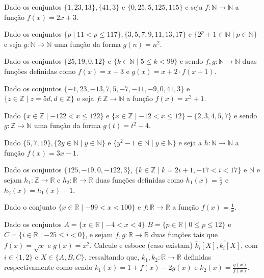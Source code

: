 \begin{exerList}
	\item Dado os conjuntos $\{1,23,13\}, \{41,3\}$ e $\{0, 25, 5, 125, 115\}$ e seja $f: \mathbb{N} \rightarrow \mathbb{N}$ a função $f(x)=2x+3$.
	\item Dado os conjuntos $\{p \mid 11 < p \leq 117\}, \{3, 5, 7, 9, 11, 13, 17\}$ e $\{2^p + 1 \in \mathbb{N} \mid p \in \mathbb{N}\}$ e seja $g: \mathbb{N} \rightarrow \mathbb{N}$ uma função da forma $g(n)= n^2$.
	\item Dado os conjuntos $\{25, 19, 0, 12\}$ e $\{k \in \mathbb{N} \mid 5 \leq k < 99\}$ e sendo $f, g: \mathbb{N} \rightarrow \mathbb{N}$ duas funções definidas como $f(x)=x + 3$ e $g(x) = x + 2\cdot f(x + 1)$.
	\item Dado os conjuntos $\{-1, 23,-13, 7, 5, -7, -11, -9, 0, 41,3\}$ e $\{z \in \mathbb{Z} \mid z = 5d, d \in \mathbb{Z}\}$ e seja $f: \mathbb{Z} \rightarrow \mathbb{N}$ a função $f(x)=x^2 + 1$.
	\item Dado $\{x \in \mathbb{Z} \mid -122 < x \leq 122\}$ e $\{x \in \mathbb{Z} \mid -12 < x \leq 12\} - \{2, 3, 4, 5, 7\}$ e sendo $g: \mathbb{Z} \rightarrow \mathbb{N}$ uma função da forma $g(t)= t^2 - 4$.
	\item Dado $\{5, 7, 19\}, \{2y \in \mathbb{N} \mid y \in \mathbb{N}\}$ e $\{y^2 - 1 \in \mathbb{N} \mid y \in \mathbb{N}\}$ e seja a $h: \mathbb{N} \rightarrow \mathbb{N}$ a função $f(x)= 3x - 1$.
	\item Dado os conjuntos $\{125, -19, 0, -122, 3\}$, $\{k \in \mathbb{Z} \mid k = 2i + 1, -17 < i < 17\}$ e $\mathbb{N}$ e sejam $h_1: \mathbb{Z} \rightarrow \mathbb{R}$ e $h_2: \mathbb{R} \rightarrow \mathbb{R}$ duas funções definidas como $h_1(x)= \displaystyle\frac{x}{2}$ e $h_2(x) = h_1(x) + 1$.
	\item Dado o conjunto $\{x \in \mathbb{R} \mid -99 < x < 100\}$ e $f: \mathbb{R} \rightarrow \mathbb{R}$ a função $f(x)=\displaystyle\frac{1}{x}$.
\end{exerList}

\begin{questao}\label{prob:Funcao5.1}
  Dado os conjuntos $A = \{x \in \mathbb{R} \mid -4 < x < 4\}$ $B = \{p \in \mathbb{R} \mid 0 \leq p \leq 12\}$ e $C = \{i \in \mathbb{R} \mid -25 \leq i < 0\}$, e sejam $f, g: \mathbb{R} \rightarrow \mathbb{R}$ duas funções tais que $f(x)= \sqrt{x}$ e $g(x) = x^2$. Calcule e esboce (caso existam) $\overleftarrow{k_i}[X], \overrightarrow{k_i}[X]$, com $i \in \{1, 2\}$ e $X \in \{A, B, C\}$, ressaltando que, $k_1, k_2 : \mathbb{R} \rightarrow \mathbb{R}$ definidas respectivamente como sendo $k_1(x) = 1 + f(x) - 2g(x)$ e $k_2(x) = \displaystyle\frac{g(x)}{f(x)}$.
\end{questao}

